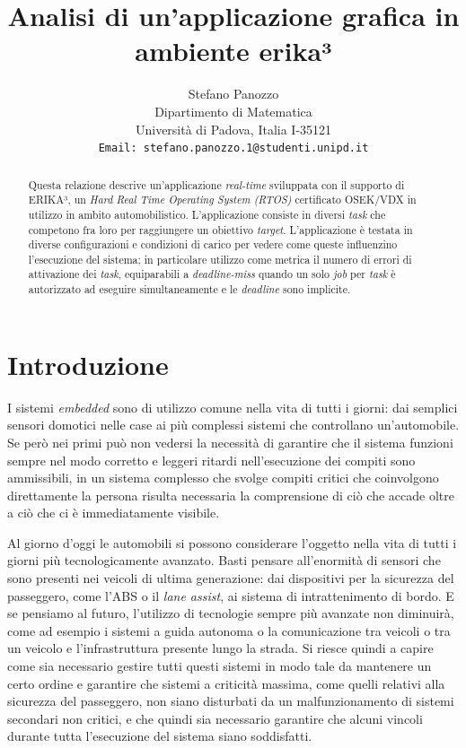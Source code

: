 \documentclass{article}
\title{Analisi di un'applicazione grafica in ambiente erika³}
\author{
  Stefano Panozzo\\
  Dipartimento di Matematica\\
  Università di Padova, Italia I-35121\\
  \texttt{Email: stefano.panozzo.1@studenti.unipd.it} \\
}
\date{}
\begin{document}
\maketitle

\begin{abstract}
Questa relazione descrive un'applicazione \textit{real-time} sviluppata con il supporto di ERIKA³, un \textit{Hard Real Time Operating System (RTOS)} certificato OSEK/VDX in utilizzo in ambito automobilistico. L'applicazione consiste in diversi \textit{task} che competono fra loro per raggiungere un obiettivo \textit{target}. L'applicazione è testata in diverse configurazioni e condizioni di carico per vedere come queste influenzino l'esecuzione del sistema; in particolare utilizzo come metrica il numero di errori di attivazione dei \textit{task}, equiparabili a \textit{deadline-miss} quando un solo \textit{job} per \textit{task} è autorizzato ad eseguire simultaneamente e le \textit{deadline} sono implicite.
\end{abstract}


\section{Introduzione}
I sistemi \textit{embedded} sono di utilizzo comune nella vita di tutti i giorni: dai semplici sensori domotici nelle case ai più complessi sistemi che controllano un'automobile. Se però nei primi può non vedersi la necessità di garantire che il sistema funzioni sempre nel modo corretto e leggeri ritardi nell'esecuzione dei compiti sono ammissibili, in un sistema complesso che svolge compiti critici che coinvolgono direttamente la persona risulta necessaria la comprensione di ciò che accade oltre a ciò che ci è immediatamente visibile.

Al giorno d'oggi le automobili si possono considerare l'oggetto nella vita di tutti i giorni più tecnologicamente avanzato. Basti pensare all'enormità di sensori che sono presenti nei veicoli di ultima generazione: dai dispositivi per la sicurezza del passeggero, come l'ABS o il \textit{lane assist}, ai sistema di intrattenimento di bordo. E se pensiamo al futuro, l'utilizzo di tecnologie sempre più avanzate non diminuirà, come ad esempio i sistemi a guida autonoma o la comunicazione tra veicoli o tra un veicolo e l'infrastruttura presente lungo la strada. Si riesce quindi a capire come sia necessario gestire tutti questi sistemi in modo tale da mantenere un certo ordine e garantire che sistemi a criticità massima, come quelli relativi alla sicurezza del passeggero, non siano disturbati da un malfunzionamento di sistemi secondari non critici, e che quindi sia necessario garantire che alcuni vincoli durante tutta l'esecuzione del sistema siano soddisfatti.
\end{document}
